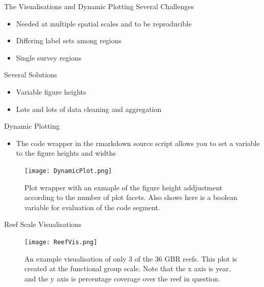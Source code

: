 \documentclass{beamer}
\begin{document}
              \begin{frame}{The Visualisations and Dynamic Plotting}
                Several Challenges
                  \begin{itemize}
                    \item Needed at multiple spatial scales and to be reproducible
                    \item Differing label sets among regions
                    \item Single survey regions
                  \end{itemize}

                  \medskip

                Several Solutions
                  \begin{itemize}
                    \item Variable figure heights
                    \item Lots and lots of data cleaning and aggregation
                  \end{itemize}
              \end{frame}

              \begin{frame}{Dynamic Plotting}
                \begin{itemize}
                  \item The code wrapper in the rmarkdown source script allows you to set a variable to the figure heights and widths
                \end{itemize}

                \begin{figure}
                    \centering
                    \texttt{[image: DynamicPlot.png]}
                    \caption{Plot wrapper with an exmaple of the figure height addjustment according to the number of plot facets. Also shows here is a boolean variable for evaluation of the code segment. }
                \end{figure}
              \end{frame}

              \begin{frame}{Reef Scale Visualisations}
                \begin{figure}
                    \centering
                    \texttt{[image: ReefVis.png]}
                    \caption{An example visualisation of only 3 of the 36 GBR reefs. This plot is created at the functional group scale. Note that the x axis is year, and the y axis is percentage coverage over the reef in question. }
                \end{figure}
             \end{frame}
\end{document}

